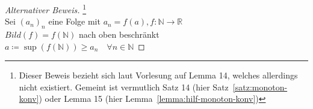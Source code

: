 \documentclass[11pt, twoside, a4paper]{article}
\theoremstyle{plain}
\newcommand{\pair}[1]{\left(#1\right)}
\newcommand{\definedas}[0]{\coloneqq}
\newcommand{\fromto}{\rightarrow{}}
\newcommand{\naturalnumbers}{\mathbb{N}}
\newcommand{\realnumbers}{\mathbb{R}}
\begin{document}
    \begin{proof}[Alternativer Beweis]
        \footnote{Dieser Beweis bezieht sich laut Vorlesung auf Lemma 14, welches allerdings nicht existiert. Gemeint ist vermutlich Satz 14 (hier Satz~\ref{satz:monoton-konv}) oder Lemma 15 (hier Lemma~\ref{lemma:hilf-monoton-konv})}
        ~\\
        Sei $(a_n)_n$ eine Folge mit $a_n = f(a), f:\naturalnumbers\fromto\realnumbers$\\
        $Bild(f) = f(\naturalnumbers)$ nach oben beschränkt\\
        $a\definedas\sup\pair{f\pair{\naturalnumbers}}\geq a_n \quad\forall n\in\naturalnumbers$
    \end{proof}

    \newpage

\end{document}
